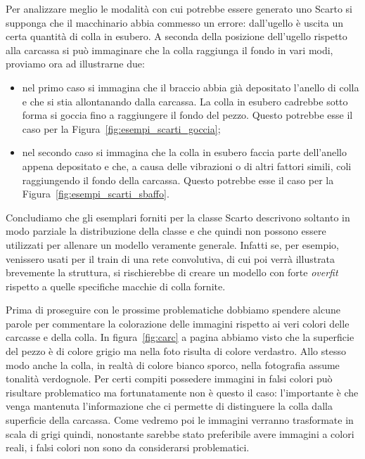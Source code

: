 Per analizzare meglio le modalità con cui potrebbe essere generato uno Scarto si supponga che il macchinario abbia commesso un errore: dall'ugello è uscita un certa quantità di colla in esubero.
A seconda della posizione dell'ugello rispetto alla carcassa si può immaginare che la colla raggiunga il fondo in vari modi, proviamo ora ad illustrarne due:
\begin{itemize}
  \item nel primo caso si immagina che il braccio abbia già depositato l'anello di colla e che si stia allontanando dalla carcassa.
    La colla in esubero cadrebbe sotto forma si goccia fino a raggiungere il fondo del pezzo.
    Questo potrebbe esse il caso per la Figura~\ref{fig:esempi_scarti_goccia};
  \item nel secondo caso si immagina che la colla in esubero faccia parte dell'anello appena depositato e che, a causa delle vibrazioni o di altri fattori simili, coli raggiungendo il fondo della carcassa.
    Questo potrebbe esse il caso per la Figura~\ref{fig:esempi_scarti_sbaffo}.
\end{itemize}

Concludiamo che gli esemplari forniti per la classe Scarto descrivono soltanto in modo parziale la distribuzione della classe  e che quindi non possono essere utilizzati per allenare un modello veramente generale.
Infatti se, per esempio, venissero usati per il train di una rete convolutiva, di cui poi verrà illustrata brevemente la struttura, si rischierebbe di creare un modello con forte \textit{overfit} rispetto a quelle specifiche macchie di colla fornite.

Prima di proseguire con le prossime problematiche dobbiamo spendere alcune parole per commentare la colorazione delle immagini rispetto ai veri colori delle carcasse e della colla.
In figura~\ref{fig:carc} a pagina \pageref{fig:carc} abbiamo visto che la superficie del pezzo è di colore grigio ma nella foto risulta di colore verdastro.
Allo stesso modo anche la colla, in realtà di colore bianco sporco, nella fotografia assume tonalità verdognole.
Per certi compiti possedere immagini in falsi colori può risultare problematico ma fortunatamente non è questo il caso: l'importante è che venga mantenuta l'informazione che ci permette di distinguere la colla dalla superficie della carcassa.
Come vedremo poi le immagini verranno trasformate in scala di grigi quindi, nonostante sarebbe stato preferibile avere immagini a colori reali, i falsi colori non sono da considerarsi problematici.

